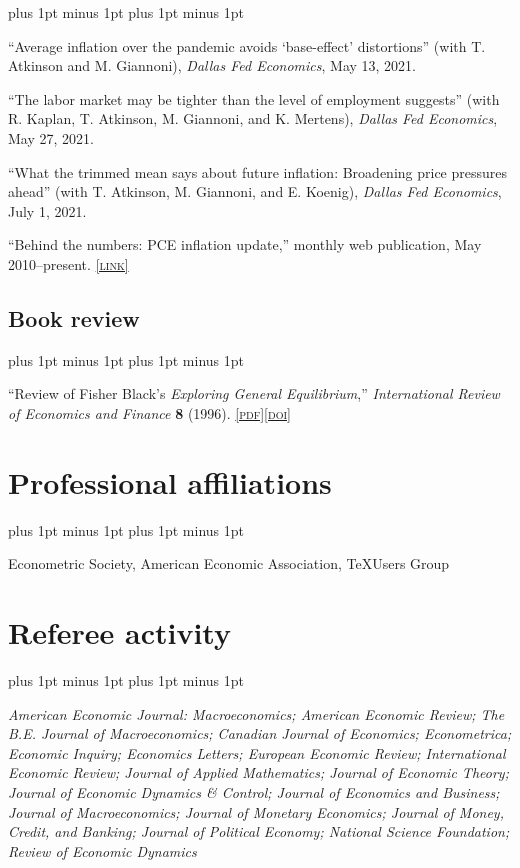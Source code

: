 \documentclass[letterpaper]{article}
\renewenvironment{itemize}{
  \begin{list}{}{
    \setlength{\leftmargin}{1.5em}
    \itemsep -1pt plus 1pt minus 1pt
    \topsep -1pt plus 1pt minus 1pt
  }
}{
  \end{list}
}
\newcommand{\pdf}[1]{\href{#1}{\scriptsize\textsc{[pdf]}}}
\newcommand{\doi}[1]{\href{http://dx.doi.org/#1}{\scriptsize\textsc{[doi]}}}
\begin{document}
\begin{itemize}
\item ``Average inflation over the pandemic avoids `base-effect' distortions'' (with T. Atkinson and M. Giannoni), \textit{Dallas Fed Economics}, May 13, 2021.

\item ``The labor market may be tighter than the level of employment suggests'' (with R. Kaplan, T. Atkinson, M. Giannoni, and K. Mertens), \textit{Dallas Fed Economics}, May 27, 2021.

\item ``What the trimmed mean says about future inflation: Broadening price pressures ahead'' (with T. Atkinson, M. Giannoni, and E. Koenig), \textit{Dallas Fed Economics}, July 1, 2021.

\item ``Behind the numbers: PCE inflation update,'' monthly web publication, May 2010--present.  \href{http://dallasfed.org/research/pce/inflation.cfm}{\scriptsize\textsc{[link]}} 
\end{itemize}

\subsection*{Book review}
\begin{itemize}
\item ``Review of Fisher Black's \textit{Exploring General Equilibrium},'' \textit{International Review of Economics and Finance} \textbf{8} (1996). \pdf{https://jimdolmas.github.io/assets/fisher_black.pdf}\doi{10.1016/S1059-0560(96)90038-6}
\end{itemize}

\section*{Professional affiliations}
\begin{itemize}
\item Econometric Society, American Economic Association, \TeX Users Group
\end{itemize}

\section*{Referee activity}
\begin{itemize}
\item\textit{American Economic Journal: Macroeconomics; American Economic Review; The B.E. Journal of Macroeconomics; Canadian Journal of Economics; Econometrica; Economic Inquiry; Economics Letters; European Economic Review; International Economic Review; Journal of Applied Mathematics; Journal of Economic Theory; Journal of Economic Dynamics \& Control; Journal of Economics and Business; Journal of Macroeconomics; Journal of Monetary Economics; Journal of Money, Credit, and Banking; Journal of Political Economy; National Science Foundation; Review of Economic Dynamics}
\end{itemize}
\end{document}
